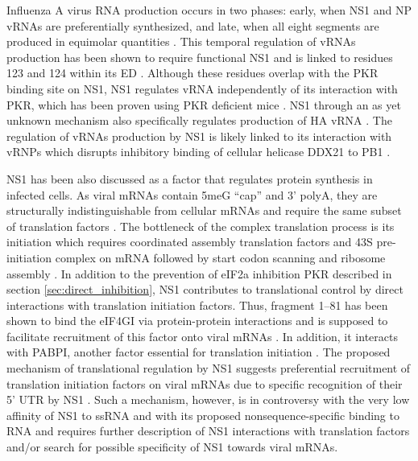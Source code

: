 		Influenza A virus RNA production occurs in two phases: early, when \gls{NS1} and \gls{NP} vRNAs are preferentially synthesized, and late, when all eight segments are produced in equimolar quantities \parencite{Shapiro1987, Skehel1973}. This temporal regulation of vRNAs production has been shown to require functional \gls{NS1} \parencite{Falcon2004} and is linked to residues 123 and 124 within its ED \parencite{Min2007}. Although these residues overlap with the \gls{PKR} binding site on NS1, NS1 regulates vRNA independently of its interaction with PKR, which has been proven using PKR deficient mice \parencite{Min2007}. NS1 through an as yet unknown mechanism also specifically regulates production of HA vRNA \parencite{Maamary2012}. The regulation of vRNAs production by NS1 is likely linked to its interaction with \gls{vRNP}s which disrupts inhibitory binding of cellular helicase DDX21 to PB1 \parencite{Marion1997a, Chen2014}.
		
		\gls{NS1} has been also discussed as a factor that regulates protein synthesis in infected cells. As viral mRNAs contain \gls{5meG} ``cap'' and 3' \gls{polyA}, they are structurally indistinguishable from cellular mRNAs and require the same subset of translation factors \parencite{Poch1989, Poon1999}. The bottleneck of the complex translation process is its initiation which requires coordinated assembly translation factors and 43S pre-initiation complex on mRNA followed by start codon scanning and ribosome assembly \parencite{Pestova2001}. In addition to the prevention of \gls{eIF2a} inhibition \gls{PKR} described in section \ref{sec:direct_inhibition}, \gls{NS1} contributes to translational control by direct interactions with translation initiation factors. Thus, fragment 1--81 has been shown to bind the \gls{eIF4GI} via protein-protein interactions and is supposed to facilitate recruitment of this factor onto viral mRNAs \parencite{Aragon2000}. In addition, it interacts with \gls{PABP}I, another factor essential for translation initiation \parencite{Burgui2003}. The proposed mechanism of translational regulation by \gls{NS1} suggests preferential recruitment of translation initiation factors on viral mRNAs due to specific recognition of their 5' \gls{UTR} by NS1 \parencite{DelaLuna1995}. Such a mechanism, however, is in controversy with the very low affinity of NS1 to ssRNA and with its proposed nonsequence-specific binding to RNA \parencite{Hatada1992} and requires further description of NS1 interactions with translation factors and/or search for possible specificity of NS1 towards viral mRNAs.
	
